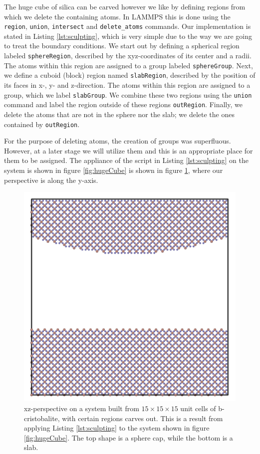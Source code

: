 \documentclass[twoside,english]{uiofysmaster}
\begin{document}
The huge cube of silica can be carved however we like by defining regions from which we delete the containing atoms. 
In LAMMPS this is done using the \texttt{region}, \texttt{union}, \texttt{intersect} and \texttt{delete\_atoms} commands. 
Our implementation is stated in Listing \ref{lst:sculpting}, which is very simple due to the way we are going to treat the boundary conditions. 
We start out by defining a spherical region labeled \texttt{sphereRegion}, described by the xyz-coordinates of its center and a radii. 
The atoms within this region are assigned to a group labeled \texttt{sphereGroup}. 
Next, we define a cuboid (block) region named \texttt{slabRegion}, described by the position of its faces in x-, y- and z-direction. 
The atoms within this region are assigned to a group, which we label \texttt{slabGroup}.  
We combine these two regions using  the \texttt{union} command and label the region outside of these regions \texttt{outRegion}.
Finally, we delete the atoms that are not in the sphere nor the slab; we delete the ones contained by \texttt{outRegion}.

For the purpose of deleting atoms, the creation of groups was superfluous.
However, at a later stage we will utilize them and this is an appropriate place for them to be assigned. 
The appliance of the script in Listing \ref{lst:sculpting} on the system is shown in figure \ref{fig:hugeCube} is shown in figure \ref{fig:carvedxz}, where our perspective is along the y-axis.
\begin{figure}[H]
\centering
\includegraphics[width=0.5\linewidth]{figures/CreatingSystem/carved_xz.png}
\caption{xz-perspective on a system built from $15\times15\times15$ unit cells of b-cristobalite, with certain regions carves out. This is a result from applying Listing \ref{lst:sculpting} to the system shown in figure \ref{fig:hugeCube}. The top shape is a sphere cap, while the bottom is a slab.}
\label{fig:carvedxz}
\end{figure}
\end{document}
